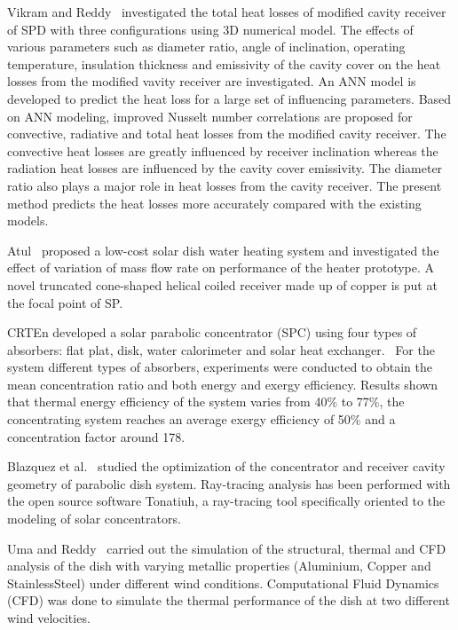 Vikram and Reddy~\cite{Vikram2015} investigated the total heat losses of modified cavity receiver of SPD with three configurations using 3D numerical model. The effects of various parameters such as diameter ratio, angle of inclination, operating temperature, insulation thickness and emissivity of the cavity cover on the heat losses from the modified vavity receiver are investigated. An ANN model is developed to predict the heat loss for a large set of influencing parameters. Based on ANN modeling, improved Nusselt number correlations are proposed for convective, radiative and total heat losses from the modified cavity receiver. The convective heat losses are greatly influenced by receiver inclination whereas the radiation heat losses are influenced by the cavity cover emissivity. The diameter ratio also plays a major role in heat losses from the cavity receiver. The present method predicts the heat losses more accurately compared with the existing models.

Atul~\cite{Atul2015} proposed a low-cost solar dish water heating system and investigated the effect of variation of mass flow rate on performance of the heater prototype. A novel truncated cone-shaped helical coiled receiver made up of copper is put at the focal point of SP.

CRTEn developed a solar parabolic concentrator (SPC) using four types of absorbers: flat plat, disk, water calorimeter and solar heat exchanger.~\cite{Skouri2013} For the system different types of absorbers, experiments were conducted to obtain the mean concentration ratio and both energy and exergy efficiency. Results shown that thermal energy efficiency of the system varies from 40\% to 77\%, the concentrating system reaches an average exergy efficiency of 50\% and a concentration factor around 178.

Blazquez et al.~\cite{Blazquez2016} studied the optimization of the concentrator and receiver cavity geometry of parabolic dish system. Ray-tracing analysis has been performed with the open source software Tonatiuh, a ray-tracing tool specifically oriented to the modeling of solar concentrators.

Uma and Reddy~\cite{Uma2015} carried out the simulation of the structural, thermal and CFD analysis of the dish with varying metallic properties (Aluminium, Copper and StainlessSteel) under different wind conditions. Computational Fluid Dynamics (CFD) was done to simulate the thermal performance of the dish at two different wind velocities.

